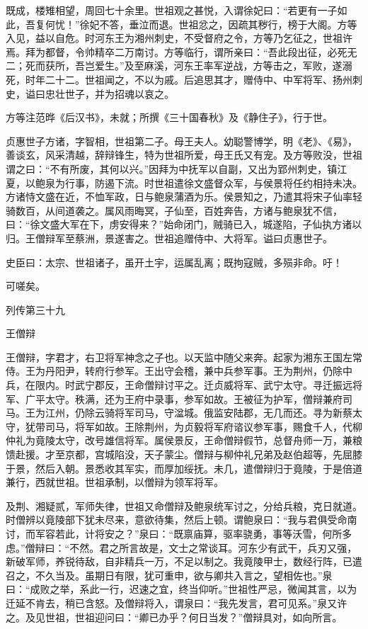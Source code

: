 \documentclass[12pt,UTF8]{ctexbook}
\begin{document}
既成，楼雉相望，周回七十余里。世祖观之甚悦，入谓徐妃曰：“若更有一子如此，吾复何忧！”徐妃不答，垂泣而退。世祖忿之，因疏其秽行，榜于大阁。方等入见，益以自危。时河东王为湘州刺史，不受督府之令，方等乃乞征之，世祖许焉。拜为都督，令帅精卒二万南讨。方等临行，谓所亲曰：“吾此段出征，必死无二；死而获所，吾岂爱生。”及至麻溪，河东王率军逆战，方等击之，军败，遂溺死，时年二十二。世祖闻之，不以为戚。后追思其才，赠侍中、中军将军、扬州刺史，谥曰忠壮世子，并为招魂以哀之。

方等注范晔《后汉书》，未就；所撰《三十国春秋》及《静住子》，行于世。

贞惠世子方诸，字智相，世祖第二子。母王夫人。幼聪警博学，明《老》、《易》，善谈玄，风采清越，辞辩锋生，特为世祖所爱，母王氏又有宠。及方等败没，世祖谓之曰：“不有所废，其何以兴。”因拜为中抚军以自副，又出为郢州刺史，镇江夏，以鲍泉为行事，防遏下流。时世祖遣徐文盛督众军，与侯景将任约相持未决。方诸恃文盛在近，不恤军政，日与鲍泉蒲酒为乐。侯景知之，乃遣其将宋子仙率轻骑数百，从间道袭之。属风雨晦冥，子仙至，百姓奔告，方诸与鲍泉犹不信，曰：“徐文盛大军在下，虏安得来？”始命闭门，贼骑已入，城遂陷，子仙执方诸以归。王僧辩军至蔡洲，景遂害之。世祖追赠侍中、大将军。谥曰贞惠世子。

史臣曰：太宗、世祖诸子，虽开土宇，运属乱离；既拘寇贼，多殒非命。吁！

可嗟矣。





列传第三十九

王僧辩

王僧辩，字君才，右卫将军神念之子也。以天监中随父来奔。起家为湘东王国左常侍。王为丹阳尹，转府行参军。王出守会稽，兼中兵参军事。王为荆州，仍除中兵，在限内。时武宁郡反，王命僧辩讨平之。迁贞威将军、武宁太守。寻迁振远将军、广平太守。秩满，还为王府中录事，参军如故。王被征为护军，僧辩兼府司马。王为江州，仍除云骑将军司马，守湓城。俄监安陆郡，无几而还。寻为新蔡太守，犹带司马，将军如故。王除荆州，为贞毅将军府谘议参军事，赐食千人，代柳仲礼为竟陵太守，改号雄信将军。属侯景反，王命僧辩假节，总督舟师一万，兼粮馈赴援。才至京都，宫城陷没，天子蒙尘。僧辩与柳仲礼兄弟及赵伯超等，先屈膝于景，然后入朝。景悉收其军实，而厚加绥抚。未几，遣僧辩归于竟陵，于是倍道兼行，西就世祖。世祖承制，以僧辩为领军将军。

及荆、湘疑贰，军师失律，世祖又命僧辩及鲍泉统军讨之，分给兵粮，克日就道。时僧辨以竟陵部下犹未尽来，意欲待集，然后上顿。谓鲍泉曰：“我与君俱受命南讨，而军容若此，计将安之？”泉曰：“既禀庙算，驱率骁勇，事等沃雪，何所多虑。”僧辩曰：“不然。君之所言故是，文士之常谈耳。河东少有武干，兵刃又强，新破军师，养锐待敌，自非精兵一万，不足以制之。我竟陵甲士，数经行阵，已遣召之，不久当及。虽期日有限，犹可重申，欲与卿共入言之，望相佐也。”泉曰：“成败之举，系此一行，迟速之宜，终当仰听。”世祖性严忌，微闻其言，以为迁延不肯去，稍已含怒。及僧辩将入，谓泉曰：“我先发言，君可见系。”泉又许之。及见世祖，世祖迎问曰：“卿已办乎？何日当发？”僧辩具对，如向所言。
\end{document}
